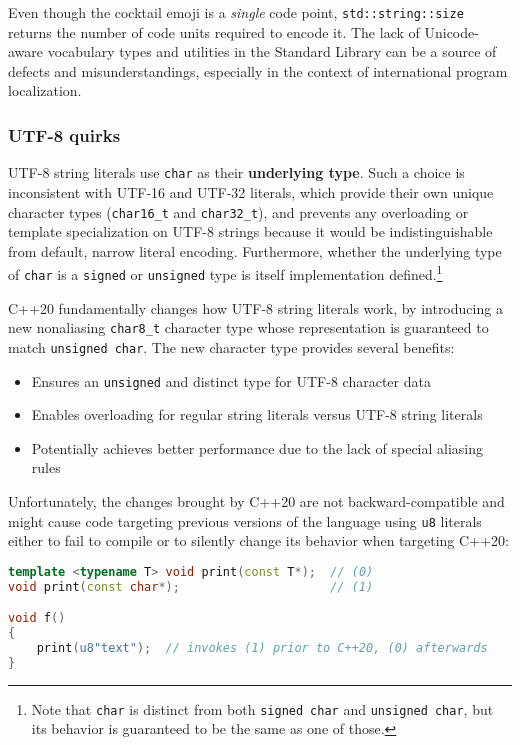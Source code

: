 \noindent Even though the cocktail emoji is a \emph{single} code point,
\texttt{std::string::size} returns the number of code units required to
encode it. The lack of Unicode-aware vocabulary types and utilities in
the Standard Library can be a source of defects and misunderstandings,
especially in the context of international program localization.

\subsubsection[UTF-8 quirks]{UTF-8 quirks}\label{utf-8-quirks}

UTF-8 string literals use \texttt{char} as their \textbf{underlying type}. Such a
choice is inconsistent with UTF-16 and UTF-32 literals, which provide
their own unique character types (\texttt{char16\_t} and
\texttt{char32\_t}), and prevents any overloading or template
specialization on UTF-8 strings because it would be indistinguishable from
default, narrow literal encoding. Furthermore, whether the underlying
type of \texttt{char} is a \texttt{signed} or \texttt{unsigned} type is
itself implementation defined.{\cprotect\footnote{Note that
\texttt{char} is distinct from both \texttt{signed}~\texttt{char} and
\texttt{unsigned}~\texttt{char}, but its behavior is guaranteed to be
  the same as one of those.}}
  
C++20
fundamentally changes how UTF-8 string literals work, by introducing a
new nonaliasing \texttt{char8\_t} character type whose representation
is guaranteed to match \texttt{unsigned}~\texttt{char}. The new
character type provides several benefits:
\begin{itemize}
\item{Ensures an \texttt{unsigned} and distinct type for UTF-8 character data}
\item{Enables overloading for regular string literals versus UTF-8 string literals}
\item{Potentially achieves better performance due to the lack of special aliasing rules}
\end{itemize}
Unfortunately, the changes brought by C++20 are not
backward-compatible and might cause code targeting previous versions
of the language using \texttt{u8} literals either to fail to compile
or to silently change its behavior when targeting C++20:

\begin{lstlisting}[language=C++, basicstyle={\ttfamily\footnotesize}]
template <typename T> void print(const T*);  // (0)
void print(const char*);                     // (1)

void f()
{
    print(u8"text");  // invokes (1) prior to C++20, (0) afterwards
}
\end{lstlisting}
        

